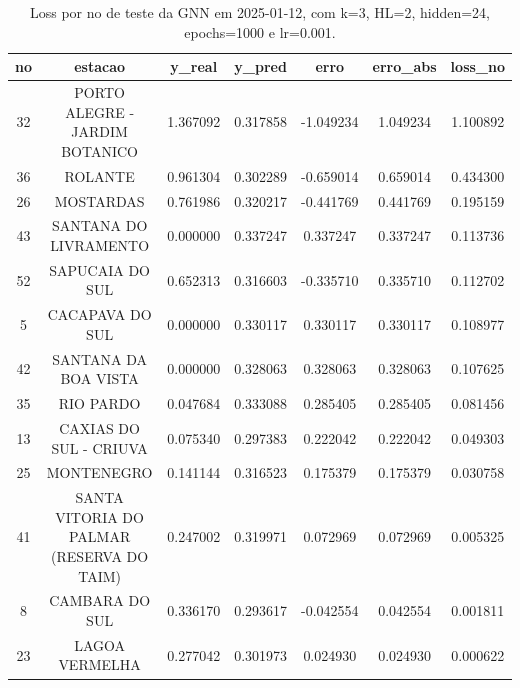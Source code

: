 \begin{table}[h]
\centering
\caption{Loss por no de teste da GNN em 2025-01-12, com k=3, HL=2, hidden=24, epochs=1000 e lr=0.001.}
\label{tab:gnn_loss_k3_hl2_h24_e1000_d20250112}
\begin{tabular}{ccccccc}
\toprule
no & estacao & y\_real & y\_pred & erro & erro\_abs & loss\_no \\
\midrule
32 & PORTO ALEGRE - JARDIM BOTANICO & 1.367092 & 0.317858 & -1.049234 & 1.049234 & 1.100892 \\
36 & ROLANTE & 0.961304 & 0.302289 & -0.659014 & 0.659014 & 0.434300 \\
26 & MOSTARDAS & 0.761986 & 0.320217 & -0.441769 & 0.441769 & 0.195159 \\
43 & SANTANA DO LIVRAMENTO & 0.000000 & 0.337247 & 0.337247 & 0.337247 & 0.113736 \\
52 & SAPUCAIA DO SUL & 0.652313 & 0.316603 & -0.335710 & 0.335710 & 0.112702 \\
5 & CACAPAVA DO SUL & 0.000000 & 0.330117 & 0.330117 & 0.330117 & 0.108977 \\
42 & SANTANA DA BOA VISTA & 0.000000 & 0.328063 & 0.328063 & 0.328063 & 0.107625 \\
35 & RIO PARDO & 0.047684 & 0.333088 & 0.285405 & 0.285405 & 0.081456 \\
13 & CAXIAS DO SUL - CRIUVA & 0.075340 & 0.297383 & 0.222042 & 0.222042 & 0.049303 \\
25 & MONTENEGRO & 0.141144 & 0.316523 & 0.175379 & 0.175379 & 0.030758 \\
41 & SANTA VITORIA DO PALMAR (RESERVA DO TAIM) & 0.247002 & 0.319971 & 0.072969 & 0.072969 & 0.005325 \\
8 & CAMBARA DO SUL & 0.336170 & 0.293617 & -0.042554 & 0.042554 & 0.001811 \\
23 & LAGOA VERMELHA & 0.277042 & 0.301973 & 0.024930 & 0.024930 & 0.000622 \\
\bottomrule
\end{tabular}
\end{table}
